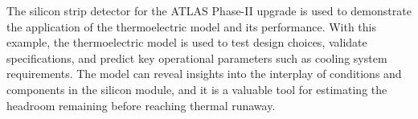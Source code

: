 
%
%

The silicon strip detector for the ATLAS Phase-II upgrade is used to demonstrate the application
of the thermoelectric model and its performance. With this example, the thermoelectric model is used
to test design choices, validate specifications, and predict key operational parameters such as
cooling system requirements. The model can reveal insights into the interplay of conditions and
components in the silicon module, and it is a valuable tool for estimating the headroom remaining
before reaching thermal runaway.
